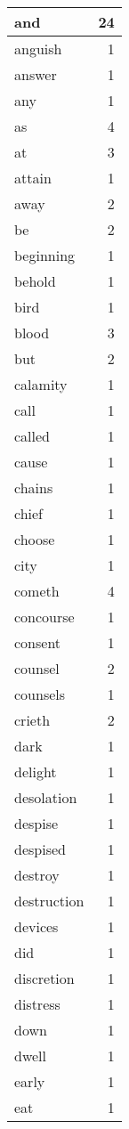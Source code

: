 \begin{center}
\begin{longtable}{l|r}
and & 24\\ \hline 
anguish & 1\\ \hline 
answer & 1\\ \hline 
any & 1\\ \hline 
as & 4\\ \hline 
at & 3\\ \hline 
attain & 1\\ \hline 
away & 2\\ \hline 
be & 2\\ \hline 
beginning & 1\\ \hline 
behold & 1\\ \hline 
bird & 1\\ \hline 
blood & 3\\ \hline 
but & 2\\ \hline 
calamity & 1\\ \hline 
call & 1\\ \hline 
called & 1\\ \hline 
cause & 1\\ \hline 
chains & 1\\ \hline 
chief & 1\\ \hline 
choose & 1\\ \hline 
city & 1\\ \hline 
cometh & 4\\ \hline 
concourse & 1\\ \hline 
consent & 1\\ \hline 
counsel & 2\\ \hline 
counsels & 1\\ \hline 
crieth & 2\\ \hline 
dark & 1\\ \hline 
delight & 1\\ \hline 
desolation & 1\\ \hline 
despise & 1\\ \hline 
despised & 1\\ \hline 
destroy & 1\\ \hline 
destruction & 1\\ \hline 
devices & 1\\ \hline 
did & 1\\ \hline 
discretion & 1\\ \hline 
distress & 1\\ \hline 
down & 1\\ \hline 
dwell & 1\\ \hline 
early & 1\\ \hline 
eat & 1\\ \hline 

\end{longtable}
\end{center}
